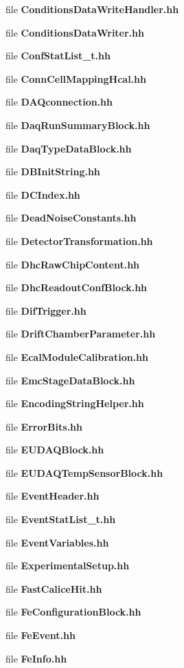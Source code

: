 \begin{DoxyCompactItemize}
file {\bfseries Conditions\-Data\-Write\-Handler.\-hh}
\item 
file {\bfseries Conditions\-Data\-Writer.\-hh}
\item 
file {\bfseries Conf\-Stat\-List\-\_\-t.\-hh}
\item 
file {\bfseries Conn\-Cell\-Mapping\-Hcal.\-hh}
\item 
file {\bfseries D\-A\-Qconnection.\-hh}
\item 
file {\bfseries Daq\-Run\-Summary\-Block.\-hh}
\item 
file {\bfseries Daq\-Type\-Data\-Block.\-hh}
\item 
file {\bfseries D\-B\-Init\-String.\-hh}
\item 
file {\bfseries D\-C\-Index.\-hh}
\item 
file {\bfseries Dead\-Noise\-Constants.\-hh}
\item 
file {\bfseries Detector\-Transformation.\-hh}
\item 
file {\bfseries Dhc\-Raw\-Chip\-Content.\-hh}
\item 
file {\bfseries Dhc\-Readout\-Conf\-Block.\-hh}
\item 
file {\bfseries Dif\-Trigger.\-hh}
\item 
file {\bfseries Drift\-Chamber\-Parameter.\-hh}
\item 
file {\bfseries Ecal\-Module\-Calibration.\-hh}
\item 
file {\bfseries Emc\-Stage\-Data\-Block.\-hh}
\item 
file {\bfseries Encoding\-String\-Helper.\-hh}
\item 
file {\bfseries Error\-Bits.\-hh}
\item 
file {\bfseries E\-U\-D\-A\-Q\-Block.\-hh}
\item 
file {\bfseries E\-U\-D\-A\-Q\-Temp\-Sensor\-Block.\-hh}
\item 
file {\bfseries Event\-Header.\-hh}
\item 
file {\bfseries Event\-Stat\-List\-\_\-t.\-hh}
\item 
file {\bfseries Event\-Variables.\-hh}
\item 
file {\bfseries Experimental\-Setup.\-hh}
\item 
file {\bfseries Fast\-Calice\-Hit.\-hh}
\item 
file {\bfseries Fe\-Configuration\-Block.\-hh}
\item 
file {\bfseries Fe\-Event.\-hh}
\item 
file {\bfseries Fe\-Info.\-hh}
\item 

\end{DoxyCompactItemize}
